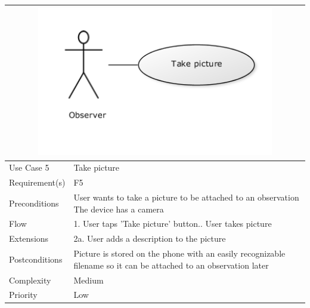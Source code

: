 \begin{tabular}[t]{|l|p{}|}
	\multicolumn{2}{c}{\includegraphics[width=0.8\textwidth]{reqspec/uc/takepicture.png}}\\\hline
	Use Case 5&Take picture\\\hline
	Requirement(s)&F5\\\hline
	Preconditions&User wants to take a picture to be attached to an observation\newline
	The device has a camera\\\hline
	Flow&1. User taps 'Take picture' button.\newline
	2. User takes picture \\\hline
	Extensions& 2a. User adds a description to the picture\\\hline
	Postconditions&Picture is stored on the phone with an easily recognizable filename so it can be attached to an observation 	later\\\hline
	Complexity&Medium\\\hline
	Priority&Low\\\hline
\end{tabular}
	
\hspace{2em}


